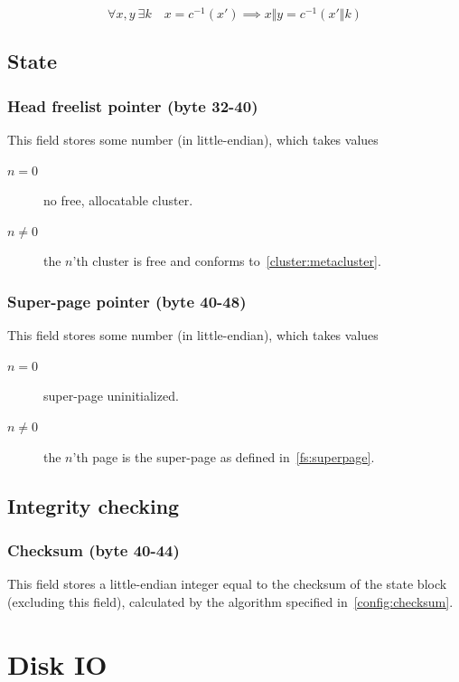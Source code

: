 \documentclass[11pt,a4paper]{report}
\newcommand{\concat}{\Vert}
\begin{document}
        $$\forall x, y \  \exists k \quad x = c^{-1}(x') \implies x \concat y = c^{-1}(x' \concat k)$$

    \section{State}
        \subsection{Head freelist pointer (byte 32-40)}
        This field stores some number (in little-endian), which takes values

        \begin{description}
            \item [$n = 0$]    no free, allocatable cluster.
            \item [$n \neq 0$] the $n$'th cluster is free and conforms
                to~\ref{cluster:metacluster}.
        \end{description}

        \subsection{Super-page pointer (byte 40-48)}
        This field stores some number (in little-endian), which takes values

        \begin{description}
            \item [$n = 0$]    super-page uninitialized.
            \item [$n \neq 0$] the $n$'th page is the super-page as
                defined in~\ref{fs:superpage}.
        \end{description}

    \section{Integrity checking}
        \subsection{Checksum (byte 40-44)}
        This field stores a little-endian integer equal to the checksum of the
        state block (excluding this field), calculated by the algorithm
        specified in~\ref{config:checksum}.

    \chapter{Disk IO}
\end{document}
